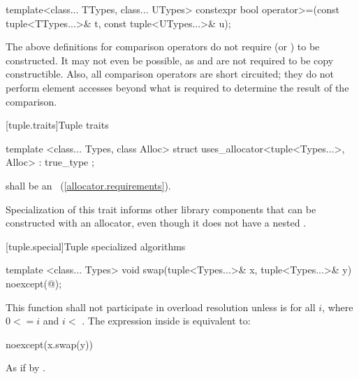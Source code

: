 %
\begin{itemdecl}
template<class... TTypes, class... UTypes>
  constexpr bool operator>=(const tuple<TTypes...>& t, const tuple<UTypes...>& u);
\end{itemdecl}

\begin{itemdescr}
\pnum\returns {}
\end{itemdescr}

\pnum \begin{note} The above definitions for comparison operators
do not require 
(or ) to be constructed. It may not
even be possible, as  and  are not required to be copy
constructible. Also, all comparison operators are short circuited;
they do not perform element accesses beyond what is required to determine the
result of the comparison. \end{note}

[tuple.traits]{Tuple traits}

%
\begin{itemdecl}
template <class... Types, class Alloc>
  struct uses_allocator<tuple<Types...>, Alloc> : true_type { };
\end{itemdecl}

\begin{itemdescr}
\pnum
\requires {} shall be an ~(\ref{allocator.requirements}).

\pnum
\begin{note} Specialization of this trait informs other library components that
 can be constructed with an allocator, even though it does not have
a nested . \end{note}
\end{itemdescr}

[tuple.special]{Tuple specialized algorithms}

%
\begin{itemdecl}
template <class... Types>
  void swap(tuple<Types...>& x, tuple<Types...>& y) noexcept(@\seebelow@);
\end{itemdecl}

\begin{itemdescr}
\pnum
\remarks This function shall not participate in overload resolution
unless  is 
for all $i$, where $0 <= i$ and $i <$ .
The expression inside  is equivalent to:

\begin{codeblock}
noexcept(x.swap(y))
\end{codeblock}

\pnum
\effects As if by .
\end{itemdescr}

